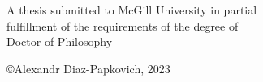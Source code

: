 \begin{titlepage}
\begin{center}
\vspace{1.5cm}

\noindent
A thesis submitted to McGill University in partial\\
fulfillment of the requirements of the degree of\\
Doctor of Philosophy


\vspace{1.4cm}

{\small \copyright Alexandr Diaz-Papkovich, 2023}


\end{center}
\end{titlepage}





